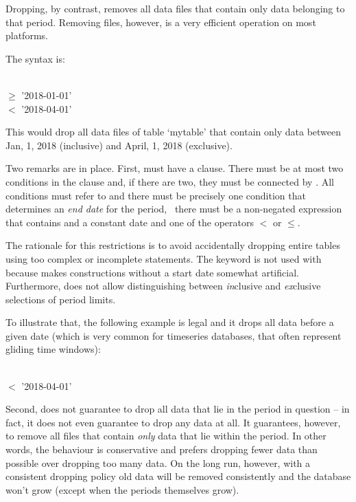 Dropping, by contrast, removes all data files 
that contain only data belonging to that period.
Removing files, however, is a very efficient
operation on most platforms.

The syntax is:

\begin{minipage}{\textwidth}
  \\
 $\ge$ '2018-01-01' \\
\hspace*{0.45cm} $<$  '2018-04-01'
\end{minipage}

This would drop all data files of table `mytable'
that contain only data between Jan, 1, 2018 (inclusive) and
April, 1, 2018 (exclusive). 

Two remarks are in place. First,
 must have a  clause.
There must be at most two conditions in the  clause
and, if there are two, they must be connected by .
All conditions must refer to  and there
must be precisely one condition that
determines an \emph{end date}
for the period, \ie\ there must be a non-negated expression
that contains  and a constant date
and one of the operators $<$ or $\le$.

The rationale for this restrictions is
to avoid accidentally dropping entire tables
using too complex or incomplete  statements.
The keyword  is not used with 
because  makes constructions
without a start date somewhat artificial.
Furthermore,  does not allow
distinguishing between \emph{in}clusive and
\emph{ex}clusive selections of period limits.

To illustrate that, the following example 
is legal and it drops all data
before a given date (which is very common
for timeseries databases, that often represent gliding
time windows):

\begin{minipage}{\textwidth}
  \\
 $<$ '2018-04-01'
\end{minipage}

Second,  does not guarantee
to drop all data that lie in the period in question --
in fact, it does not even guarantee to drop any data at all.
It guarantees, however, to remove all files
that contain \emph{only} data that lie within the period.
In other words, the behaviour is conservative
and prefers dropping fewer data than possible over
dropping too many data.
On the long run, however, with a consistent dropping policy
old data will be removed consistently and the database
won't grow (except when the periods themselves grow).


